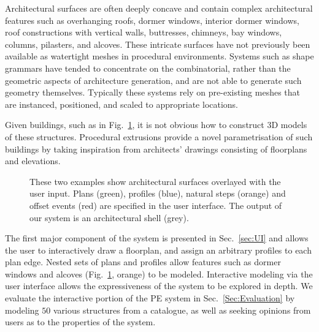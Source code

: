 Architectural surfaces are often deeply concave and contain complex architectural features such as overhanging roofs, dormer windows, interior dormer windows, roof constructions with vertical walls, buttresses, chimneys, bay windows, columns, pilasters, and alcoves. These intricate surfaces have not previously been available as watertight meshes in procedural environments. Systems such as shape grammars\cite{Stiny80,Mueller:2006:PMB,Lipp:2008:IEV} have tended to concentrate on the combinatorial, rather than the geometric aspects of architecture generation, and are not able to generate such geometry themselves. Typically these systems rely on pre-existing meshes that are instanced, positioned, and scaled to appropriate locations.

Given buildings, such as in Fig.~\ref{fig:two_profiles}, it is not obvious how to construct 3D models of these structures. Procedural extrusions provide a novel parametrisation of such buildings by taking inspiration from architects' drawings consisting of floorplans and elevations. 

\begin{figure}
  \centering
  \def\svgwidth{1.0\columnwidth}
  
  \caption[Plans and profiles of two architectural models]{\label{fig:two_profiles}
  These two examples show architectural surfaces overlayed with the user input. Plans (green), profiles (blue), natural steps (orange) and offset events (red) are specified in the user interface. The output of our system is an architectural shell (grey). }
\end{figure}

The first major component of the system is presented in Sec.~\ref{sec:UI} and allows the user to interactively draw a floorplan, and assign an arbitrary profiles to each plan edge. Nested sets of plans and profiles allow features such as dormer windows and alcoves (Fig.~\ref{fig:two_profiles}, orange) to be modeled. Interactive modeling via the user interface allows the expressiveness of the system to be explored in depth. We evaluate the interactive portion of the PE system in Sec.~\ref{Sec:Evaluation} by modeling $50$ various structures from a catalogue, as well as seeking opinions from users as to the properties of the system.

